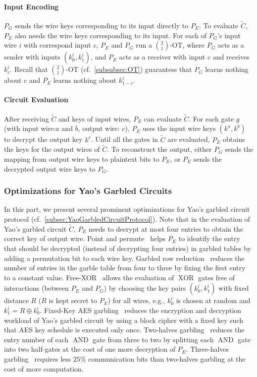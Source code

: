 \paragraph{Input Encoding}
$P_G$ sends the wire keys corresponding to its input directly to $P_E$. To evaluate $\widetilde{C}$, $P_E$ also needs the wire keys corresponding to its input. For each of $P_G$'s input wire $i$ with correspond input $c$, $P_E$ and $P_G$ run a $\binom{2}{1}$-OT, where $P_G$ acts as a sender with inputs $\left(k_0^i,k_1^i\right)$, and $P_E$ acts as a receiver with input $c$ and receives $k_c^i$. Recall that $\binom{2}{1}$-OT (cf.~\autoref{subsubsec:OT}) guarantess that $P_G$ learns nothing about $c$ and $P_E$ learns nothing about $k_{1-c}^i$.

\paragraph{Circuit Evaluation}
After receiving $\widetilde{C}$ and keys of input wires, $P_E$ can evaluate $\widetilde{C}$. For each gate $g$ (with input wire:$a$ and $b$, output wire: $c$), $P_E$ uses the input wire keys $\left(k^a,k^b\right)$ to decrypt the output key $k^c$. Until all the gates in $\widetilde{C}$ are evaluated, $P_E$ obtains the keys for the output wires of $\widetilde{C}$. To reconstruct the output, either $P_G$ sends the mapping from output wire keys to plaintext bits to $P_E$, or $P_E$ sends the decrypted output wire keys to $P_G$.


\subsubsection{Optimizations for Yao's Garbled Circuits}
In this part, we present several prominent optimizations for Yao's garbled circuit protocol (cf.~\autoref{subsec:YaoGarbledCircuitProtocol}).
Note that in the evaluation of Yao's garbled circuit $\widetilde{C}$, $P_E$ needs to decrypt at most four entries to obtain the correct key of output wire. Point and permute~\cite{beaver1990round} helps $P_E$ to identify the entry that should be decrypted (instead of decrypting four entries) in garbled tables by adding a permutation bit to each wire key.
Garbled row reduction~\cite{naor1999privacy} reduces the number of entries in the garble table from four to three by fixing the first entry to a constant value.
Free-XOR~\cite{kolesnikov2008improved} allows the evaluation of $\operatorname{XOR}$ gates free of interactions (between $P_E$ and $P_G$) by choosing the key pairs $\left(k_0^i,k_1^i\right)$ with fixed distance $R$ ($R$ is kept secret to $P_E$) for all wires, e.g., $k_0^i$ is chosen at random and $ k_1^i=R\oplus k_0^i $.
Fixed-Key AES garbling~\cite{bellare2013efficient} reduces the encryption and decryption workload of Yao's garbled circuit by using a block cipher with a fixed key such that AES key schedule is executed only once.
Two-halves garbling~\cite{zahur2015two} reduces the entry number of each $\operatorname{AND}$ gate from three to two by splitting each $\operatorname{AND}$ gate into two half-gates at the cost of one more decryption of $P_E$.
Three-halves garbling~\cite{rosulek2021three} requires less $25\%$ communication bits than two-halves garbling at the cost of more computation.

